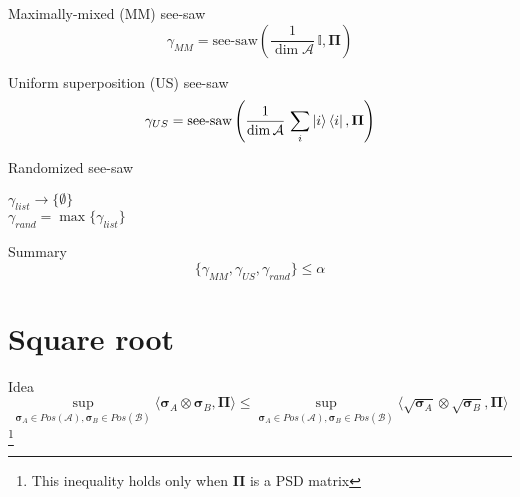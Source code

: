 \documentclass{beamer}
\begin{document}
    \begin{frame}{Maximally-mixed (MM) see-saw}
        $$
            \gamma_{MM} = \mbox{see-saw}\left(\frac{1}{\dim\mathcal{A}}\,\mathbb{I}, \mathbf{\Pi}\right)
        $$
    \end{frame}
    
    \begin{frame}{Uniform superposition (US) see-saw}
        $$
            \gamma_{US} = \mbox{see-saw}\left(\frac{1}{\dim\mathcal{A}}\,\sum\limits_{i}\ket{i}\bra{i}, \mathbf{\Pi}\right)
        $$
    \end{frame}
    
    \begin{frame}{Randomized see-saw}
        \begin{algorithm}[H]
            $\gamma_{list} \rightarrow \{\emptyset\}$ \\
            $\gamma_{rand} = \max\{\gamma_{list}\}$
            \caption{random see-saw}
        \end{algorithm}
    \end{frame}
    
    \begin{frame}{Summary}
        $$
            \{\gamma_{MM}, \gamma_{US}, \gamma_{rand}\} \le \alpha
        $$
    \end{frame}
    
\section{Square root}
    \begin{frame}{Idea}
        $$
            \sup\limits_{\mathbf{\sigma}_{A}\in Pos(\mathcal{A}), \mathbf{\sigma}_{B}\in Pos(\mathcal{B})}\langle\mathbf{\sigma}_{A}\otimes\mathbf{\sigma}_{B}, \mathbf{\Pi}\rangle \le \sup\limits_{\mathbf{\sigma}_{A}\in Pos(\mathcal{A}), \mathbf{\sigma}_{B}\in Pos(\mathcal{B})}\langle\sqrt{\mathbf{\sigma}_{A}}\otimes\sqrt{\mathbf{\sigma}_{B}}, \mathbf{\Pi}\rangle
        $$
        \footnote{This inequality holds only when $\mathbf{\Pi}$ is a PSD matrix}
    \end{frame}
    
\end{document}
